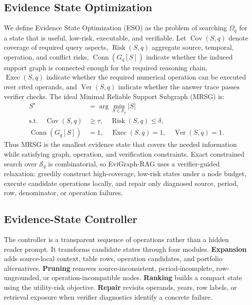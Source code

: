 \documentclass[letterpaper]{article}
\begin{document}
\subsection{Evidence State Optimization}

We define Evidence State Optimization (ESO) as the problem of searching \(\Omega_q\) for a state that is useful, low-risk, executable, and verifiable.
Let \(\operatorname{Cov}(S,q)\) denote coverage of required query aspects, \(\operatorname{Risk}(S,q)\) aggregate source, temporal, operation, and conflict risks, \(\operatorname{Conn}(G_q[S])\) indicate whether the induced support graph is connected enough for the required reasoning chain, \(\operatorname{Exec}(S,q)\) indicate whether the required numerical operation can be executed over cited operands, and \(\operatorname{Ver}(S,q)\) indicate whether the answer trace passes verifier checks.
The ideal Minimal Reliable Support Subgraph (MRSG) is:
\[
\begin{aligned}
S^\star &= \arg\min_{S\in\mathcal{S}_q} |S| \\
\text{s.t.}\quad
\operatorname{Cov}(S,q)&\ge \tau,\quad
\operatorname{Risk}(S,q)\le \delta,\\
\operatorname{Conn}(G_q[S])&=1,\quad
\operatorname{Exec}(S,q)=1,\quad
\operatorname{Ver}(S,q)=1.
\end{aligned}
\]
Thus MRSG is the smallest evidence state that covers the needed information while satisfying graph, operation, and verification constraints.
Exact constrained search over \(\mathcal{S}_q\) is combinatorial, so EviGraph-RAG uses a verifier-guided relaxation: greedily construct high-coverage, low-risk states under a node budget, execute candidate operations locally, and repair only diagnosed source, period, row, denominator, or operation failures.

\subsection{Evidence-State Controller}

The controller is a transparent sequence of operations rather than a hidden reader prompt.
It transforms candidate states through four modules.
\textbf{Expansion} adds source-local context, table rows, operation candidates, and portfolio alternatives.
\textbf{Pruning} removes source-inconsistent, period-incomplete, row-ungrounded, or operation-incompatible nodes.
\textbf{Ranking} builds a compact state using the utility-risk objective.
\textbf{Repair} revisits operands, years, row labels, or retrieval exposure when verifier diagnostics identify a concrete failure.
\end{document}
